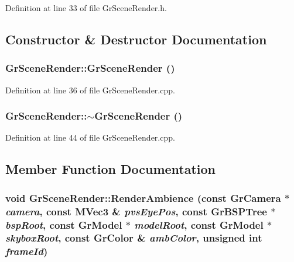 Definition at line 33 of file GrSceneRender.h.

\subsection{Constructor \& Destructor Documentation}
\hypertarget{class_gr_scene_render_092d37ccce05bcf350aa89099376cd1a}{
\subsubsection[{GrSceneRender}]{\setlength{\rightskip}{0pt plus 5cm}GrSceneRender::GrSceneRender ()}}
\label{class_gr_scene_render_092d37ccce05bcf350aa89099376cd1a}




Definition at line 36 of file GrSceneRender.cpp.\hypertarget{class_gr_scene_render_2fa5b2608cd04ca49156de2446fc3e17}{
\subsubsection[{$\sim$GrSceneRender}]{\setlength{\rightskip}{0pt plus 5cm}GrSceneRender::$\sim$GrSceneRender ()}}
\label{class_gr_scene_render_2fa5b2608cd04ca49156de2446fc3e17}




Definition at line 44 of file GrSceneRender.cpp.

\subsection{Member Function Documentation}
\hypertarget{class_gr_scene_render_70bf228594a41d830084e5619dbec778}{
\subsubsection[{RenderAmbience}]{\setlength{\rightskip}{0pt plus 5cm}void GrSceneRender::RenderAmbience (const {\bf GrCamera} $\ast$ {\em camera}, \/  const {\bf MVec3} \& {\em pvsEyePos}, \/  const {\bf GrBSPTree} $\ast$ {\em bspRoot}, \/  const {\bf GrModel} $\ast$ {\em modelRoot}, \/  const {\bf GrModel} $\ast$ {\em skyboxRoot}, \/  const {\bf GrColor} \& {\em ambColor}, \/  unsigned int {\em frameId})}}
\label{class_gr_scene_render_70bf228594a41d830084e5619dbec778}




